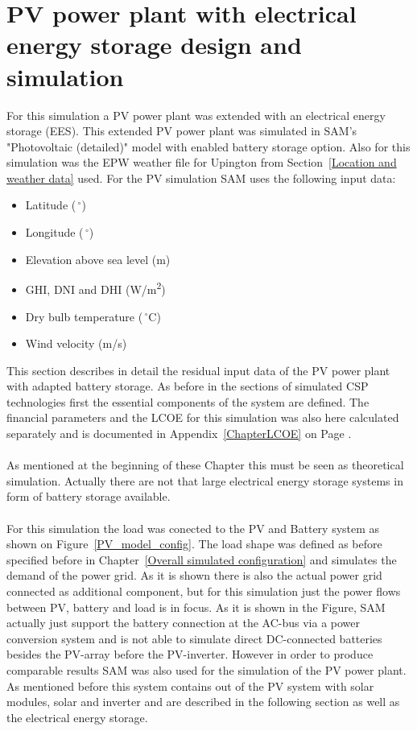 \documentclass[Master,MEE,english]{twbook}%
\begin{document}
\section{PV power plant with electrical energy storage design and simulation}
For this simulation a PV power plant was extended with an electrical energy storage (EES). This extended PV power plant was simulated in SAM's "Photovoltaic (detailed)" model with enabled battery storage option. Also for this simulation was the EPW weather file for Upington from Section~\ref{Location and weather data} used. For the PV simulation SAM uses the following input data:
\begin{itemize}
\item Latitude ($\,^{\circ}$)
\item Longitude ($\,^{\circ}$)
\item Elevation above sea level (m)
\item GHI, DNI and DHI (W/m\textsuperscript{2})
\item Dry bulb temperature ($\,^{\circ}\mathrm{C}$)
\item Wind velocity (m/s)
\end{itemize}
This section describes in detail the residual input data of the PV power plant with adapted battery storage. As before in the sections of simulated CSP technologies first the essential components of the system are defined. The financial parameters and the LCOE for this simulation was also here calculated separately and is documented in Appendix~\ref{ChapterLCOE} on Page \pageref{ChapterLCOE}.\\
\\
As mentioned at the beginning of these Chapter this must be seen as theoretical simulation. Actually there are not that large electrical energy storage systems in form of battery storage available.\\
\\
For this simulation the load was conected to the PV and Battery system as shown on Figure~\ref{PV_model_config}. The load shape was defined as before specified before in Chapter~\ref{Overall simulated configuration} and simulates the demand of the power grid. As it is shown there is also the actual power grid connected as additional component, but for this simulation just the power flows between PV, battery and load is in focus. As it is shown in the Figure, SAM actually just support the battery connection at the AC-bus via a power conversion system and is not able to simulate direct DC-connected batteries besides the PV-array before the PV-inverter. However in order to produce comparable results SAM was also used for the simulation of the PV power plant. As mentioned before this system contains out of the PV system with solar modules, solar and inverter and are described in the following section as well as the electrical energy storage.
\end{document}
